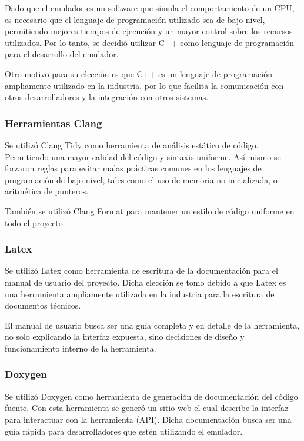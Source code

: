 Dado que el emulador es un software que simula el comportamiento de un CPU, es necesario que el lenguaje de programación utilizado sea de bajo nivel, permitiendo mejores tiempos de ejecución y un mayor control sobre los recursos utilizados. Por lo tanto, se decidió utilizar C++ como lenguaje de programación para el desarrollo del emulador.

Otro motivo para su elección es que C++ es un lenguaje de programación ampliamente utilizado en la industria, por lo que facilita la comunicación con otros desarrolladores y la integración con otros sistemas.

\subsubsection{Herramientas Clang}
\label{subsec:clang_tidy}

Se utilizó Clang Tidy como herramienta de análisis estático de código. Permitiendo una mayor calidad del código y sintaxis uniforme. Así mismo se forzaron reglas para evitar malas prácticas comunes en los lenguajes de programación de bajo nivel, tales como el uso de memoria no inicializada, o aritmética de punteros.

También se utilizó Clang Format para mantener un estilo de código uniforme en todo el proyecto.

\subsubsection{Latex}
\label{subsec:latex}

Se utilizó Latex como herramienta de escritura de la documentación para el manual de usuario del proyecto. Dicha elección se tomo debido a que Latex es una herramienta ampliamente utilizada en la industria para la escritura de documentos técnicos.

El manual de usuario busca ser una guía completa y en detalle de la herramienta, no solo explicando la interfaz expuesta, sino decisiones de diseño y funcionamiento interno de la herramienta.

\subsubsection{Doxygen}
\label{subsec:doxygen}

Se utilizó Doxygen como herramienta de generación de documentación del código fuente. Con esta herramienta se generó un sitio web el cual describe la interfaz para interactuar con la herramienta (API). Dicha documentación busca ser una guía rápida para desarrolladores que estén utilizando el emulador.


